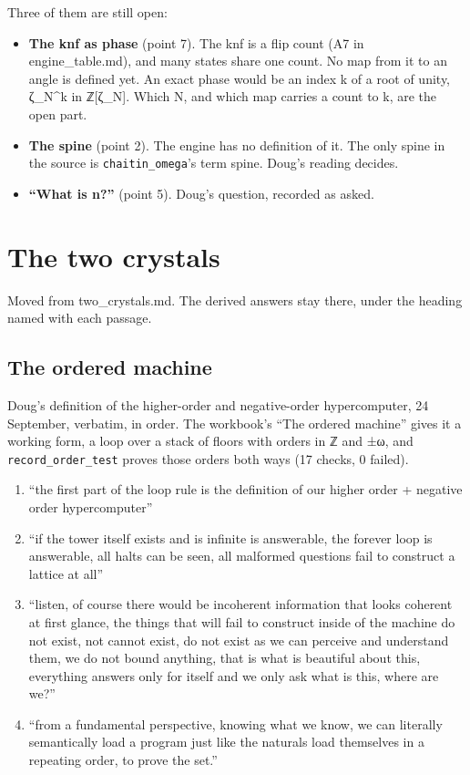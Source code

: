 Three of them are still open:

\begin{itemize}
\item \textbf{The knf as phase} (point 7). The knf is a flip count (A7 in engine\_\allowbreak{}table.md), and many states share one count. No map from it to an angle is defined yet. An exact phase would be an index k of a root of unity, ζ\_\allowbreak{}N\textasciicircum{}k in ℤ[ζ\_\allowbreak{}N]. Which N, and which map carries a count to k, are the open part.
\item \textbf{The spine} (point 2). The engine has no definition of it. The only spine in the source is \texttt{chaitin\_\allowbreak{}omega}'s term spine. Doug's reading decides.
\item \textbf{“What is n?”} (point 5). Doug's question, recorded as asked.
\end{itemize}

\section{\texorpdfstring{The two crystals}{The two crystals}}

Moved from two\_\allowbreak{}crystals.md. The derived answers stay there, under the heading named with each passage.

\subsection{\texorpdfstring{The ordered machine}{The ordered machine}}

Doug's definition of the higher-order and negative-order hypercomputer, 24 September, verbatim, in order. The workbook's “The ordered machine” gives it a working form, a loop over a stack of floors with orders in ℤ and ±ω, and \texttt{record\_\allowbreak{}order\_\allowbreak{}test} proves those orders both ways (17 checks, 0 failed).

\begin{enumerate}
\item “the first part of the loop rule is the definition of our higher order + negative order hypercomputer”
\item “if the tower itself exists and is infinite is answerable, the forever loop is answerable, all halts can be seen, all malformed questions fail to construct a lattice at all”
\item “listen, of course there would be incoherent information that looks coherent at first glance, the things that will fail to construct inside of the machine do not exist, not cannot exist, do not exist as we can perceive and understand them, we do not bound anything, that is what is beautiful about this, everything answers only for itself and we only ask what is this, where are we?”
\item “from a fundamental perspective, knowing what we know, we can literally semantically load a program just like the naturals load themselves in a repeating order, to prove the set.”

\end{enumerate}

